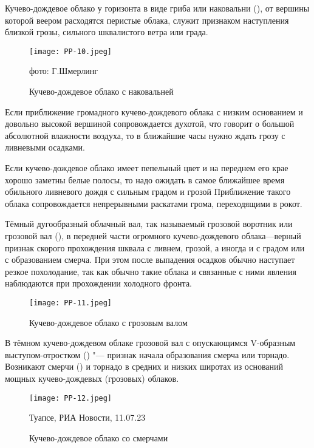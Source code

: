  Кучево-дождевое облако у горизонта в виде гриба или наковальни
(), от вершины которой веером расходятся перистые облака,
служит признаком наступления близкой грозы, сильного шквалистого ветра
или града.

\begin{figure}[htb]
  \centering{}
  \texttt{[image: PP-10.jpeg]}
  \caption{Кучево-дождевое облако с наковальней}
  \label{fig:pp10}
  \small
  \centering{}фото: Г.Шмерлинг
\end{figure}


 Если приближение громадного кучево-дождевого облака с низким
основанием и довольно высокой вершиной сопровождается духотой, что
говорит о большой абсолютной влажности воздуха, то в ближайшие часы
нужно ждать грозу с ливневыми осадками.

 Если кучево-дождевое облако имеет пепельный цвет и на переднем
его крае хорошо заметны белые полосы, то надо ожидать в самое
ближайшее время обильного ливневого дождя с сильным градом и грозой
Приближение такого облака сопровождается непрерывными раскатами грома,
переходящими в рокот.

 Тёмный дугообразный облачный вал, так называемый грозовой
воротник или грозовой вал (), в передней части огромного
кучево-дождевого облака—верный признак скорого прохождения шквала с
ливнем, грозой, а иногда и с градом или с образованием смерча. При этом
после выпадения осадков обычно наступает резкое похолодание, так как
обычно такие облака и связанные с ними явления наблюдаются при
прохождении холодного фронта.

\begin{figure}[htb]
  \centering{}
  \texttt{[image: PP-11.jpeg]}
  \caption{Кучево-дождевое облако с грозовым валом}
  \label{fig:pp11}
  \small
  \centering{}
\end{figure}

 В тёмном кучево-дождевом облаке грозовой вал с опускающимся
V-образным выступом-отростком () "--- признак начала образования
смерча или торнадо. Возникают смерчи () и торнадо в средних и
низких широтах из оснований мощных кучево-дождевых (грозовых) облаков.

\begin{figure}[htb]
  \centering{}
  \texttt{[image: PP-12.jpeg]}
  \caption{Кучево-дождевое облако со смерчами}
  \label{fig:pp12}
  \small
  \centering{}Туапсе, РИА Новости, 11.07.23
\end{figure}


